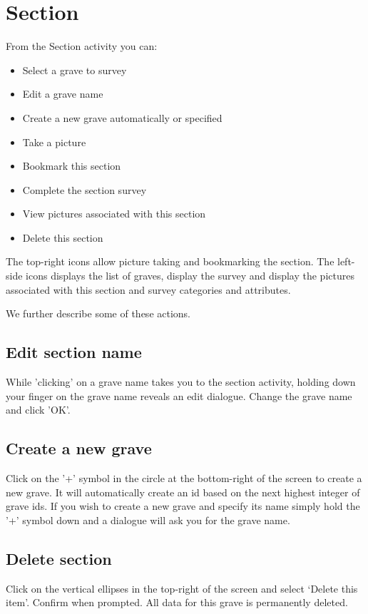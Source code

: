 \documentclass{scrreprt}
\begin{document}
\section{Section}
From the Section activity you can:
\begin{itemize}
\item Select a grave to survey
\item Edit a grave name
\item Create a new grave automatically or specified
\item Take a picture
\item Bookmark this section
\item Complete the section survey
\item View pictures associated with this section
\item Delete this section
\end{itemize}

The top-right icons allow picture taking and bookmarking the section. The left-side icons displays the list of graves, display the survey and display the pictures associated with this section and survey categories and attributes.

We further describe some of these actions.

\subsection{Edit section name}
While 'clicking' on a grave name takes you to the section activity, holding down  your finger on the grave name reveals an edit dialogue. Change the grave name and click 'OK'.

\subsection{Create a new grave}
Click on the '+' symbol in the circle at the bottom-right of the screen to create a new grave. It will automatically create an id based on the next highest integer of grave ids. If you wish to create a new grave and specify its name simply hold the '+' symbol down and a dialogue will ask you for the grave name.

\subsection{Delete section}
Click on the vertical ellipses in the top-right of the screen and select `Delete this item'. Confirm when prompted. All data for this grave is permanently deleted.
\end{document}
